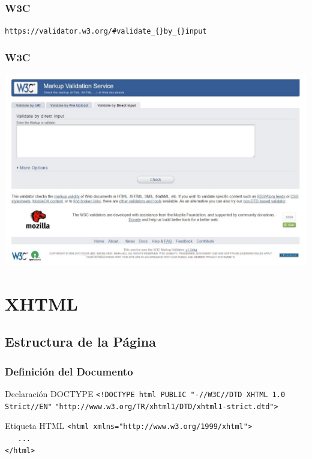 \documentclass{beamer}
\begin{document}
\begin{frame}[fragile]
\frametitle{W3C}
	\begin{center}
	\verb|https://validator.w3.org/#validate_{}by_{}input|
	\end{center}
\end{frame}

\begin{frame}
\frametitle{W3C}
 \includegraphics[scale=.32]{images/W3Cvalidator.jpg}
\end{frame}

\section{XHTML}
	\subsection{Estructura de la Página}
\begin{frame}[fragile] %
\frametitle{Definición del Documento}
	\begin{block}{Declaración DOCTYPE}
	\scriptsize{\verb|<!DOCTYPE html PUBLIC "-//W3C//DTD XHTML 1.0 Strict//EN"|}
	\scriptsize{\verb|"http://www.w3.org/TR/xhtml1/DTD/xhtml1-strict.dtd">|}
	\end{block}
	
	\begin{block}{Etiqueta HTML}
	\scriptsize{\verb|<html xmlns="http://www.w3.org/1999/xhtml">|}\\
	\scriptsize{\verb|   ...|}\\
	\scriptsize{\verb|</html>|}
	\end{block}
\end{frame}
\end{document}
